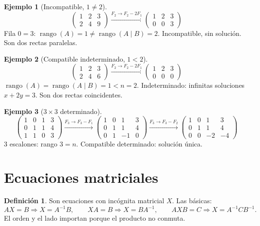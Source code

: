 \documentclass[a4paper,12pt]{article}
\theoremstyle{definition}
\newtheorem{definicion}{Definición}[section]
\newtheorem{ejemplo}{Ejemplo}[section]
\begin{document}
\begin{ejemplo}[Incompatible, $1 \neq 2$]
\[
\left(\begin{array}{cc|c}
1 & 2 & 3 \\
2 & 4 & 9
\end{array}\right)
\xrightarrow{F_2 \to F_2-2F_1}
\left(\begin{array}{cc|c}
1 & 2 & 3 \\
0 & 0 & 3
\end{array}\right)
\]
Fila $0=3$: $\operatorname{rango}(A)=1 \neq \operatorname{rango}(A\mid B)=2$. Incompatible, sin soluci\'on. Son dos rectas paralelas.
\end{ejemplo}

\begin{ejemplo}[Compatible indeterminado, $1<2$]
\[
\left(\begin{array}{cc|c}
1 & 2 & 3 \\
2 & 4 & 6
\end{array}\right)
\xrightarrow{F_2 \to F_2-2F_1}
\left(\begin{array}{cc|c}
1 & 2 & 3 \\
0 & 0 & 0
\end{array}\right)
\]
$\operatorname{rango}(A)=\operatorname{rango}(A\mid B)=1 < n=2$. Indeterminado: infinitas soluciones $x+2y=3$. Son dos rectas coincidentes.
\end{ejemplo}

\begin{ejemplo}[$3 \times 3$ determinado]
\[
\left(\begin{array}{ccc|c}
1 & 0 & 1 & 3 \\
0 & 1 & 1 & 4 \\
1 & 1 & 0 & 3
\end{array}\right)
\xrightarrow{F_3 \to F_3-F_1}
\left(\begin{array}{ccc|c}
1 & 0 & 1 & 3 \\
0 & 1 & 1 & 4 \\
0 & 1 & -1 & 0
\end{array}\right)
\xrightarrow{F_3 \to F_3-F_2}
\left(\begin{array}{ccc|c}
1 & 0 & 1 & 3 \\
0 & 1 & 1 & 4 \\
0 & 0 & -2 & -4
\end{array}\right)
\]
3 escalones: rango $3=n$. Compatible determinado: soluci\'on \'unica.
\end{ejemplo}

\section{Ecuaciones matriciales}
\begin{definicion}
Son ecuaciones con incógnita matricial $X$. Las básicas:
\[
AX=B \Rightarrow X=A^{-1}B, \qquad XA=B \Rightarrow X=BA^{-1}, \qquad AXB=C \Rightarrow X=A^{-1}CB^{-1}.
\]
El orden y el lado importan porque el producto no conmuta.
\end{definicion}
\end{document}
